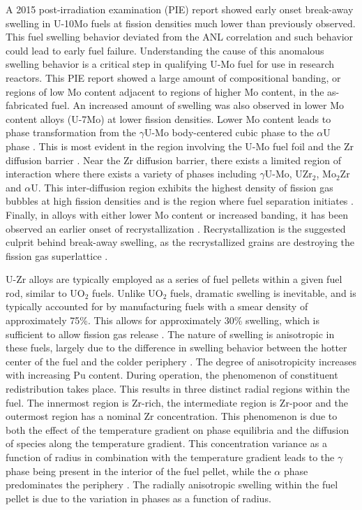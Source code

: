 \documentclass[review]{elsarticle}
\begin{document}
A 2015 post-irradiation examination (PIE) report \cite{afip6report} showed early onset break-away swelling in U-10Mo fuels at fission densities much lower than previously observed. This fuel swelling behavior deviated from the ANL correlation and such behavior could lead to early fuel failure. Understanding the cause of this anomalous swelling behavior is a critical step in qualifying U-Mo fuel for use in research reactors. This PIE report showed a large amount of compositional banding, or regions of low Mo content adjacent to regions of higher Mo content, in the as-fabricated fuel. An increased amount of swelling was also observed in lower Mo content alloys (U-7Mo) \cite{vandenberghe2014} at lower fission densities. Lower Mo content leads to phase transformation from the $\gamma$U-Mo body-centered cubic phase to the $\alpha$U phase \cite{janfong2014}. This is most evident in the region involving the U-Mo fuel foil and the Zr diffusion barrier \cite{park2015}. Near the Zr diffusion barrier, there exists a limited region of interaction where there exists a variety of phases including $\gamma$U-Mo, UZr$_{2}$, Mo$_{2}$Zr and $\alpha$U. This inter-diffusion region exhibits the highest density of fission gas bubbles at high fission densities and is the region where fuel separation initiates \cite{rertr12}. Finally, in alloys with either lower Mo content or increased banding, it has been observed an earlier onset of recrystallization \cite{kim2013A}. Recrystallization is the suggested culprit behind break-away swelling, as the recrystallized grains are destroying the fission gas superlattice \cite{vandenberghe2008}. 

U-Zr alloys are typically employed as a series of fuel pellets within a given fuel rod, similar to UO$_{2}$ fuels. Unlike UO$_{2}$ fuels, dramatic swelling is inevitable, and is typically accounted for by manufacturing fuels with a smear density of approximately 75{\%}. This allows for approximately 30\% swelling, which is sufficient to allow fission gas release \cite{beck1968}. The nature of swelling is anisotropic in these fuels, largely due to the difference in swelling behavior between the hotter center of the fuel and the colder periphery \cite{hofman1990}. The degree of anisotropicity increases with increasing Pu content. During operation, the phenomenon of constituent redistribution takes place. This results in three distinct radial regions within the fuel. The innermost region is Zr-rich, the intermediate region is Zr-poor and the outermost region has a nominal Zr concentration. This phenomenon is due to both the effect of the temperature gradient on phase equilibria and the diffusion of species along the temperature gradient. This concentration variance as a function of radius in combination with the temperature gradient leads to the $\gamma$ phase being present in the interior of the fuel pellet, while the $\alpha$ phase predominates the periphery \cite{kobayashi1990, kim2004}. The radially anisotropic swelling within the fuel pellet is due to the variation in phases as a function of radius.
\end{document}
